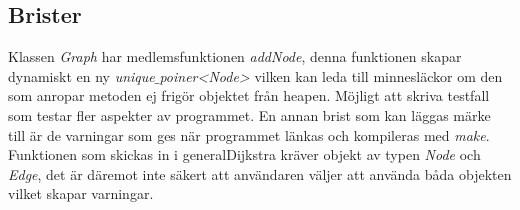 \documentclass[12pt]{article}
\begin{document}
\subsection*{Brister}
Klassen \textit{Graph} har medlemsfunktionen \textit{addNode}, denna funktionen skapar dynamiskt en ny \textit{unique$\_$poiner<Node>} vilken kan leda till minnesläckor om den som anropar metoden ej frigör objektet från heapen. 
Möjligt att skriva testfall som testar fler aspekter av programmet. En annan brist som kan läggas märke till är de varningar som ges när programmet länkas och kompileras med \textit{make}. Funktionen som skickas in i generalDijkstra kräver objekt av typen \textit{Node} och \textit{Edge}, det är däremot inte säkert att användaren väljer att använda båda objekten vilket skapar varningar.










\end{document}
